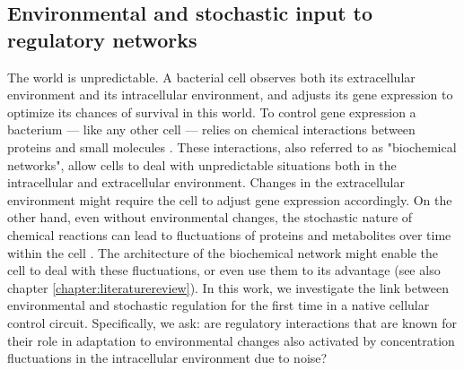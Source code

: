 \subsection{Environmental and stochastic input to regulatory networks}

The world is unpredictable.
%
A bacterial cell observes both its extracellular environment and its intracellular environment,
and adjusts its gene expression to 
optimize its chances of survival in this world.
%
To control gene expression a bacterium --- like any other cell --- relies on chemical interactions between proteins and small molecules \cite{Bray1995, Alon2006, Alon2007, Tyson2010}.
These interactions, also referred to as "biochemical networks", 
%
allow cells to deal with 
unpredictable situations
both in the intracellular and extracellular environment.
%
Changes in the extracellular environment might require the cell to adjust gene expression accordingly.
%
On the other hand,  even without environmental changes, the stochastic nature of chemical reactions can lead to fluctuations of proteins and metabolites over time within the cell \cite{Elowitz2002,Kiviet2014}.
The architecture of the biochemical network might enable the cell to deal with these fluctuations, or even use them to its advantage (see also chapter \ref{chapter:literaturereview}).
%
%
In this work, we investigate the link between environmental and stochastic regulation for the first time in a native cellular control circuit. %
%
Specifically, we ask:
are regulatory interactions that are known for their role in adaptation to environmental changes also 
activated 
by concentration fluctuations in the intracellular environment due to noise?





